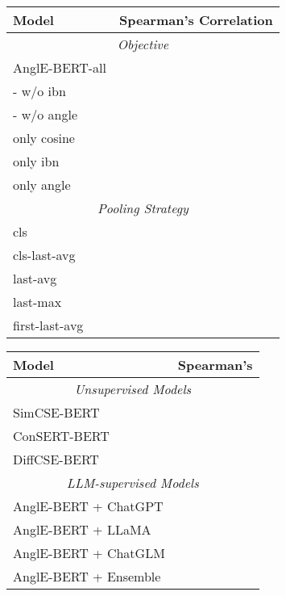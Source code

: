 \documentclass{article} \usepackage{iclr2024_conference,times}
\begin{document}
\begin{minipage}[l]{0.5\textwidth}
    \centering
    \small
    \begin{tabular}{lc}
        \toprule
        Model & Spearman's Correlation \\
        \midrule
        \midrule
        \multicolumn{2}{c}{\textit{Objective}} \\
        \midrule
        AnglE-BERT-all &  \\
        - w/o ibn &  \\
        - w/o angle &  \\
        only cosine &  \\
        only ibn &  \\
        only angle &  \\
        \midrule
        \midrule
        \multicolumn{2}{c}{\textit{Pooling Strategy}} \\
        \midrule
        cls &  \\
        cls-last-avg &  \\
        last-avg &  \\
        last-max &  \\
        first-last-avg &  \\
        \bottomrule
    \end{tabular}
    \label{table-ablation-study-results}
\end{minipage}
\begin{minipage}[l]{0.5\textwidth}
    \centering
    \small
    \begin{tabular}{lc}
        \toprule
        Model & Spearman's \\
        \midrule
        \midrule
        \multicolumn{2}{c}{\textit{Unsupervised Models}} \\
        \midrule
        SimCSE-BERT &  \\
        ConSERT-BERT &  \\
        DiffCSE-BERT &  \\
        \midrule
        \midrule
        \multicolumn{2}{c}{\textit{LLM-supervised Models}} \\
        \midrule
        AnglE-BERT + ChatGPT &  \\
        AnglE-BERT + LLaMA &  \\
        AnglE-BERT + ChatGLM &  \\
        AnglE-BERT + Ensemble &  \\
        \bottomrule
    \end{tabular}
    \label{table-supervised-learning-results}
\end{minipage}
\end{document}
